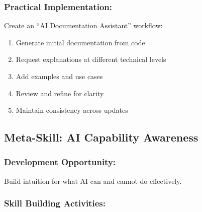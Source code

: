 \documentclass[12pt,a4paper]{article}
\begin{document}
\subsubsection*{Practical Implementation:}

Create an ``AI Documentation Assistant'' workflow:
\begin{enumerate}
    \item Generate initial documentation from code
    \item Request explanations at different technical levels
    \item Add examples and use cases
    \item Review and refine for clarity
    \item Maintain consistency across updates
\end{enumerate}

\subsection{Meta-Skill: AI Capability Awareness}

\subsubsection*{Development Opportunity:}
Build intuition for what AI can and cannot do effectively.

\subsubsection*{Skill Building Activities:}
\end{document}
